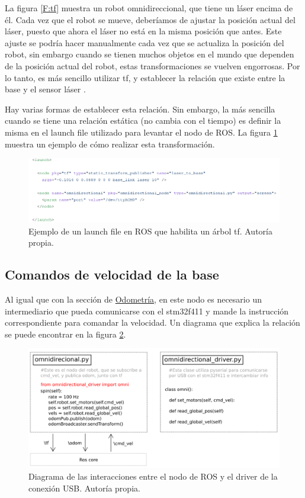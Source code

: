 La figura \ref{F:tf} muestra un robot omnidireccional, que tiene un láser encima de él. Cada vez que el robot se mueve, deberíamos de ajustar la posición actual del láser, puesto que ahora el láser no está en la misma posición que antes. Este ajuste se podría hacer manualmente cada vez que se actualiza la posición del robot, sin embargo cuando se tienen muchos objetos en el mundo que dependen de la posición actual del robot, estas transformaciones se vuelven engorrosas. Por lo tanto, es más sencillo utilizar tf, y establecer la relación que existe entre la base y el sensor láser \cite{ROSTF}.

Hay varias formas de establecer esta relación. Sin embargo, la más sencilla cuando se tiene una relación estática (no cambia con el tiempo) es definir la misma en el launch file utilizado para levantar el nodo de ROS. La figura \ref{F:launchfile} muestra un ejemplo de cómo realizar esta transformación.

\begin{figure}[H]
\centering
\includegraphics[scale=0.4]{imagenes/launch_file.png}
\caption{Ejemplo de un launch file en ROS que habilita un árbol tf. Autoría propia.}
\label{F:launchfile}
\end{figure}

\subsection{Comandos de velocidad de la base}

Al igual que con la sección de \hyperref[seccionodometria]{Odometría}, en este nodo es necesario un intermediario que pueda comunicarse con el stm32f411 y mande la instrucción correspondiente para comandar la velocidad. Un diagrama que explica la relación se puede encontrar en la figura \ref{F:rosnode}.

\begin{figure}[H]
\centering
\includegraphics[scale=0.4]{imagenes/diagrama_rosnode.png}
\caption{Diagrama de las interacciones entre el nodo de ROS y el driver de la conexión USB. Autoría propia.}
\label{F:rosnode}
\end{figure}

